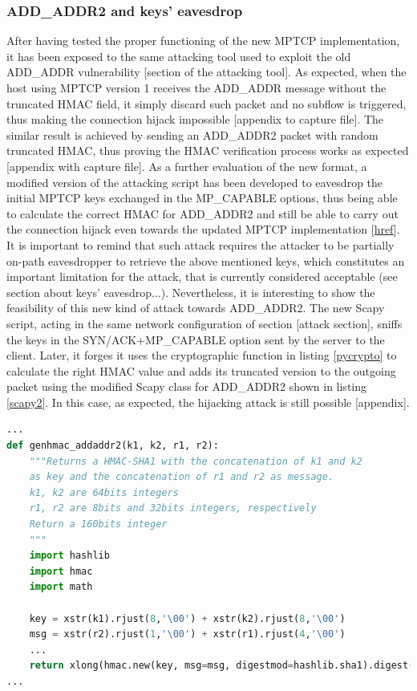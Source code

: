 \subsubsection{ADD\_ADDR2 and keys' eavesdrop}
After having tested the proper functioning of the new MPTCP implementation, it has been exposed to the same attacking tool used to exploit the old ADD\_ADDR vulnerability [section of the attacking tool]. As expected, when the host using MPTCP version 1 receives the ADD\_ADDR message without the truncated HMAC field, it simply discard such packet and no subflow is triggered, thus making the connection hijack impossible [appendix to capture file].
The similar result is achieved by sending an ADD\_ADDR2 packet with random truncated HMAC, thus proving the HMAC verification process works as expected [appendix with capture file].
As a further evaluation of the new format, a modified version of the attacking script has been developed to eavesdrop the initial MPTCP keys exchanged in the MP\_CAPABLE options, thus being able to calculate the correct HMAC for ADD\_ADDR2 and still be able to carry out the connection hijack even towards the updated MPTCP implementation [\href{https://github.com/fabriziodemaria/MPTCP-Exploit/tree/add-addr2-eav}{href}]. It is important to remind that such attack requires the attacker to be partially on-path eavesdropper to retrieve the above mentioned keys, which constitutes an important limitation for the attack, that is currently considered acceptable (see section about keys' eavesdrop...). Nevertheless, it is interesting to show the feasibility of this new kind of attack towards ADD\_ADDR2. The new Scapy script, acting in the same network configuration of section [attack section], sniffs the keys in the SYN/ACK+MP\_CAPABLE option sent by the server to the client. Later, it forges it uses the cryptographic function in listing \ref{pycrypto} to calculate the right HMAC value and adds its truncated version to the outgoing packet using the modified Scapy class for ADD\_ADDR2 shown in listing \ref{scapy2}. In this case, as expected, the hijacking attack is still possible [appendix].

\begin{lstlisting}[language=Python, caption=\textit{HMAC calculation in Python}, label=pycrypto]
...
def genhmac_addaddr2(k1, k2, r1, r2):
    """Returns a HMAC-SHA1 with the concatenation of k1 and k2
    as key and the concatenation of r1 and r2 as message.
    k1, k2 are 64bits integers
    r1, r2 are 8bits and 32bits integers, respectively
    Return a 160bits integer
    """
    import hashlib
    import hmac
    import math

    key = xstr(k1).rjust(8,'\00') + xstr(k2).rjust(8,'\00')
    msg = xstr(r2).rjust(1,'\00') + xstr(r1).rjust(4,'\00')
    ...
    return xlong(hmac.new(key, msg=msg, digestmod=hashlib.sha1).digest())
...
\end{lstlisting}

